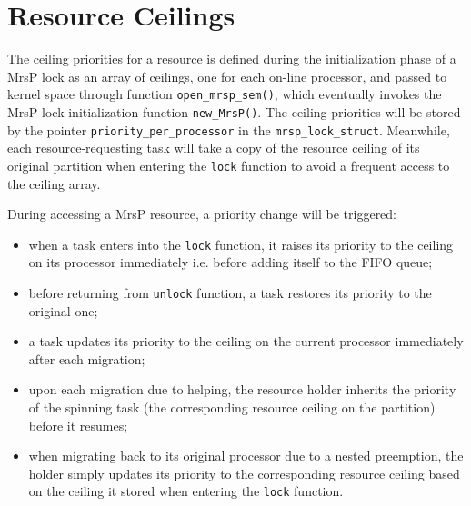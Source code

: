 \documentclass{report}
\begin{document}
\section{Resource Ceilings}
The ceiling priorities for a resource is defined during the initialization phase of a MrsP lock as an array of ceilings, one for each on-line processor, and passed to kernel space through function \texttt{open\_mrsp\_sem()}, which eventually invokes the MrsP lock initialization function \texttt{new\_MrsP()}. The ceiling priorities will be stored by the pointer \texttt{priority\_per\_processor} in the \texttt{mrsp\_lock\_struct}. Meanwhile, each resource-requesting task will take a copy of the resource ceiling of its original partition when entering the \texttt{lock} function to avoid a frequent access to the ceiling array. 

During accessing a MrsP resource, a priority change will be triggered:
\begin{itemize}
\item when a task enters into the \texttt{lock} function, it raises its priority to the ceiling on its processor immediately i.e. before adding itself to the FIFO queue;
\item before returning from \texttt{unlock} function, a task restores its priority to the original one;
\item a task updates its priority to the ceiling on the current processor immediately after each migration;
\item upon each migration due to helping, the resource holder inherits the priority of the spinning task (the corresponding resource ceiling on the partition) before it resumes;
\item when migrating back to its original processor due to a nested preemption, the holder simply updates its priority to the corresponding resource ceiling based on the ceiling it stored when entering the \texttt{lock} function.  
\end{itemize}
\end{document}
